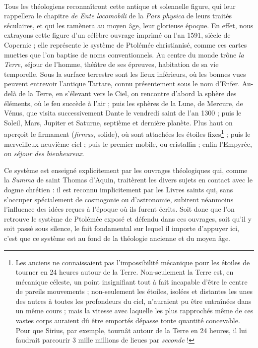 \documentclass[a4paper, 11pt, oneside, landscape]{article}
\begin{document}
\paragraph{}
Tous les théologiens reconnaîtront cette antique et solennelle figure, qui leur rappellera le chapitre \emph{de Ente locomobili} de la \emph{Pars physica} de leurs traités séculaires, et qui les ramènera au moyen âge, leur glorieuse époque. En effet, nous extrayons cette figure d'un célèbre ouvrage imprimé on l'an 1591, siècle de Copernic ; elle représente le système de Ptolémée christianisé, comme ces cartes muettes que l'on baptise de noms conventionnels. Au centre du monde trône \emph{la Terre}, séjour de l'homme, théâtre de ses épreuves, habitation de sa vie temporelle. Sous la surface terrestre sont les lieux inférieurs, où les bonnes vues peuvent entrevoir l'antique Tartare, connu présentement sous le nom d'Enfer. Au-delà de la Terre, en s'élevant vers le Ciel, on rencontre d'abord la sphère des éléments, où le feu succède à l'air ; puis les sphères de la Lune, de Mercure, de Vénus, que visita successivement Dante le vendredi saint de l'an 1300 ; puis le Soleil, Mars, Jupiter et Saturne, septième et dernière planète. Plus haut on aperçoit le firmament (\emph{firmus}, solide), où sont attachées les étoiles fixes\footnote{Les anciens ne connaissaient pas l'impossibilité mécanique pour les étoiles de tourner en 24 heures autour de la Terre. Non-seulement la Terre est, en mécanique céleste, un point insignifiant tout à fait incapable d'être le centre de pareils mouvements ; non-seulement les étoiles, isolées et distantes les unes des autres à toutes les profondeurs du ciel, n'auraient pu être entraînées dans un même cours ; mais la vitesse avec laquelle les plus rapprochés même de ces vastes corps auraient dû être emportés dépasse tonte quantité concevable. Pour que Sirius, par exemple, tournât autour de la Terre en 24 heures, il lui faudrait parcourir 3 mille millions de lieues par \emph{seconde} !} ; puis le merveilleux neuvième ciel ; puis le premier mobile, ou cristallin ; enfin l'Empyrée, ou \emph{séjour des bienheureux}.

Ce système est enseigné explicitement par les ouvrages théologiques qui, comme la \emph{Summa} de saint Thomas d'Aquin, traitèrent les divers sujets en contact avec le dogme chrétien : il est reconnu implicitement par les Livres saints qui, sans s'occuper spécialement de cosmogonie ou d'astronomie, subirent néanmoins l'influence des idées reçues à l'époque où ils furent écrits. Soit donc que l'on retrouve le système de Ptolémée exposé et défendu dans ces ouvrages, soit qu'il y soit passé sous silence, le fait fondamental sur lequel il importe d'appuyer ici, c'est que ce système est au fond de la théologie ancienne et du moyen âge.
\end{document}
